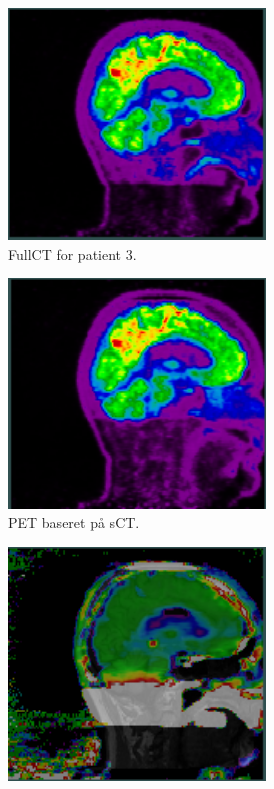 \begin{figure}[H]
\begin{subfigure}{0.3\textwidth}
        \includegraphics[width=0.75\textwidth]{colager/loocv_pet/loocv_010850_pet_ct.png}
        \caption{FullCT for patient 3.}
        \label{col:loocv_pet_pat3_ct}
    \end{subfigure}\hfill
    \begin{subfigure}{0.3\textwidth}
        \centering
        \includegraphics[width=0.75\textwidth]{colager/loocv_pet/loocv_010850_pet_sct.png}
        \caption{PET baseret på sCT.}
        \label{col:loocv_pet_pat3_sct}
    \end{subfigure}\hfill
    \begin{subfigure}{0.3\textwidth}
        \centering
        \includegraphics[width=0.75\textwidth]{colager/loocv_pet/loocv_010850_pet_pd.png}

\end{subfigure}
\end{figure}
